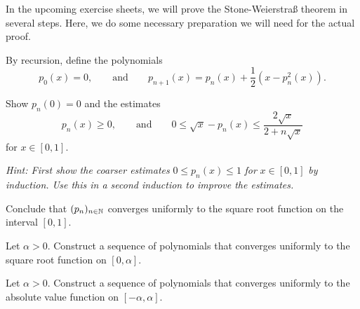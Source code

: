 \begin{Problem}
	In the upcoming exercise sheets, we will prove the Stone-Weierstraß theorem in several steps. Here, we do some necessary preparation we will need for the actual proof.

	By recursion, define the polynomials
	\[
	p_0(x)=0,\qquad\text{and}\qquad p_{n+1}(x)=p_n(x)+\frac{1}{2}(x-p_n^2(x))
	.\] 
	\begin{parts}
	\item Show $p_n(0)=0$ and the estimates
		\[
		p_n(x)\ge 0,\qquad \text{and}\qquad 0\le \sqrt{x} -p_n(x)\le \frac{2\sqrt{x} }{2+n\sqrt{x} }
		\]
		for $x\in [0,1]$.

		\emph{Hint: First show the coarser estimates} $0\le p_n(x)\le 1$ \emph{ for }$x\in [0,1]$ \emph{by induction. Use this in a second induction to improve the estimates.}
	\item Conclude that $(p_n)_{n\in \mathbb{N}}$ converges uniformly to the square root function on the interval $[0,1]$.
	\item Let $\alpha>0$. Construct a sequence of polynomials that converges uniformly to the square root function on $[0,\alpha]$.
	\item Let $\alpha>0$. Construct a sequence of polynomials that converges uniformly to the absolute value function on $[-\alpha, \alpha]$.
	\end{parts}
\end{Problem}
